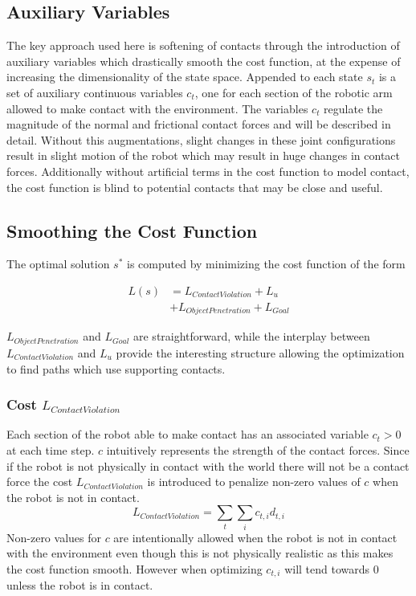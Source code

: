 \documentclass[../thesis.tex]{subfiles}
\begin{document}
\subsection{Auxiliary Variables}
The key approach used here is softening of contacts through the introduction of auxiliary variables which drastically smooth the cost function, at the expense of increasing the dimensionality of the state space.
Appended to each state $s_t$ is a set of auxiliary continuous variables $c_t$, one for each section of the robotic arm allowed to make contact with the environment.
The variables $c_t$ regulate the magnitude of the normal and frictional contact forces and will be described in detail.
Without this augmentations, slight changes in these joint configurations result in slight motion of the robot which may result in huge changes in contact forces.
Additionally without artificial terms in the cost function to model contact, the cost function is blind to potential contacts that may be close and useful.


\subsection{Smoothing the Cost Function}
The optimal solution $s^*$ is computed by minimizing the cost function of the form

\begin{align}
L(s) &= L_{Contact Violation} + L_{u} \\
&+ L_{Object Penetration} + L_{Goal}    \label{eq:cost}
\end{align}
    
$L_{Object Penetration}$ and $L_{Goal}$ are straightforward, while the interplay between $L_{Contact Violation}$ and $L_u$ provide the interesting structure allowing the optimization to find paths which use supporting contacts.




\subsubsection{Cost $L_{Contact Violation}$}
Each section of the robot able to make contact has an associated variable $c_t > 0$ at each time step. $c$ intuitively represents the strength of the contact forces.
Since if the robot is not physically in contact with the world there will not be a contact force the cost $L_{Contact Violation}$ is introduced to penalize non-zero values of $c$ when the robot is not in contact. 
$$L_{Contact Violation} = \sum_t{\sum_i{c_{t,i} d_{t,i}}}$$
Non-zero values for $c$ are intentionally allowed when the robot is not in contact with the environment even though this is not physically realistic as this makes the cost function smooth.
However when optimizing $c_{t,i}$ will tend towards 0 unless the robot is in contact.
\end{document}
